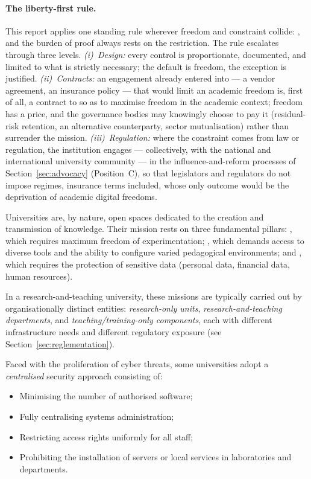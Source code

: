 \paragraph{The liberty-first rule.}
\label{par:liberty-first}
This report applies one standing rule wherever freedom and constraint
collide: , and the burden of proof always rests on the restriction.
The rule escalates through three levels. \emph{(i)~Design:} every
control is proportionate, documented, and limited to what is strictly
necessary; the default is freedom, the exception is justified.
\emph{(ii)~Contracts:} an engagement already entered into --- a vendor
agreement, an insurance policy --- that would limit an academic
freedom is, first of all, a contract to  so as to
maximise freedom in the academic context; freedom has a price, and the
governance bodies may knowingly choose to pay it (residual-risk
retention, an alternative counterparty, sector mutualisation) rather
than surrender the mission. \emph{(iii)~Regulation:} where the
constraint comes from law or regulation, the institution engages ---
collectively, with the national and international university
community --- in the influence-and-reform processes of
Section~\ref{sec:advocacy} (Position~C), so that legislators and
regulators do not impose regimes, insurance terms included, whose only
outcome would be the deprivation of academic digital freedoms.

\medskip
Universities are, by nature, open spaces dedicated to the creation
and transmission of knowledge. Their mission rests on three fundamental
pillars: , which requires maximum freedom
of experimentation; , which demands access to
diverse tools and the ability to configure varied pedagogical
environments; and , which requires the
protection of sensitive data (personal data, financial data,
human resources).

In a research-and-teaching university, these missions are typically
carried out by organisationally distinct entities: \emph{research-only units},
\emph{research-and-teaching departments}, and
\emph{teaching/training-only components}, each with different
infrastructure needs and different regulatory exposure
(see Section~\ref{sec:reglementation}).

Faced with the proliferation of cyber threats, some universities adopt
a \emph{centralised} security approach consisting of:
\begin{itemize}[nosep]
    \item Minimising the number of authorised software;
    \item Fully centralising systems administration;
    \item Restricting access rights uniformly for all
          staff;
    \item Prohibiting the installation of servers or local services in
          laboratories and departments.
\end{itemize}


